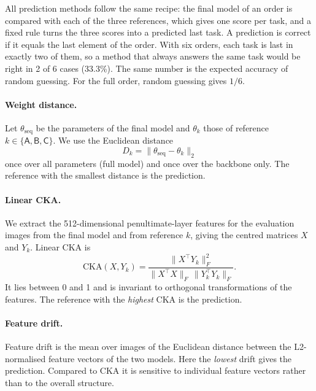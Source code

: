 \documentclass[11pt,a4paper]{article}
\newcommand{\task}[1]{\textsf{#1}}
\begin{document}
All prediction methods follow the same recipe: the final model of an order is compared with each of the three references, which gives one score per task, and a fixed rule turns the three scores into a predicted last task. A prediction is correct if it equals the last element of the order. With six orders, each task is last in exactly two of them, so a method that always answers the same task would be right in 2 of 6 cases (33.3\%). The same number is the expected accuracy of random guessing. For the full order, random guessing gives $1/6$.

\paragraph{Weight distance.} Let $\theta_\mathrm{seq}$ be the parameters of the final model and $\theta_k$ those of reference $k \in \{\task{A},\task{B},\task{C}\}$. We use the Euclidean distance
\begin{equation}
  D_k = \lVert \theta_\mathrm{seq} - \theta_k \rVert_2
\end{equation}
once over all parameters (full model) and once over the backbone only. The reference with the smallest distance is the prediction.

\paragraph{Linear CKA.} We extract the 512-dimensional penultimate-layer features for the evaluation images from the final model and from reference $k$, giving the centred matrices $X$ and $Y_k$. Linear CKA \cite{kornblith2019} is
\begin{equation}
  \mathrm{CKA}(X,Y_k) = \frac{\lVert X^{\top} Y_k \rVert_F^2}{\lVert X^{\top} X \rVert_F \, \lVert Y_k^{\top} Y_k \rVert_F}.
\end{equation}
It lies between 0 and 1 and is invariant to orthogonal transformations of the features. The reference with the \emph{highest} CKA is the prediction.

\paragraph{Feature drift.} Feature drift is the mean over images of the Euclidean distance between the L2-normalised feature vectors of the two models. Here the \emph{lowest} drift gives the prediction. Compared to CKA it is sensitive to individual feature vectors rather than to the overall structure.
\end{document}

